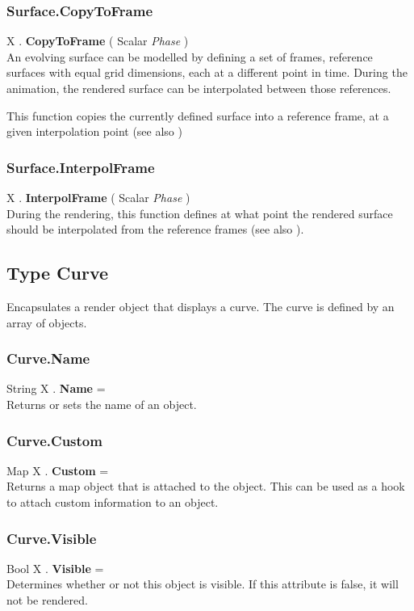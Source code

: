 \subsubsection{Surface.CopyToFrame \label{F:Surface:CopyToFrame}}
X . \textbf{CopyToFrame} ( Scalar \textit{Phase} ) \\
An evolving surface can be modelled by defining a set of frames, reference surfaces with equal grid dimensions, each at a different point in time. During the animation, the rendered surface can be interpolated between those references.

This function copies the currently defined surface into a reference frame, at a given interpolation point (see also )

\subsubsection{Surface.InterpolFrame \label{F:Surface:InterpolFrame}}
X . \textbf{InterpolFrame} ( Scalar \textit{Phase} ) \\
During the rendering, this function defines at what point the rendered surface should be interpolated from the reference frames (see also ).

\subsection{Type Curve \label{T:Curve}}
Encapsulates a render object that displays a curve. The curve is defined by an array of  objects.

\subsubsection{Curve.Name \label{F:Curve:Name}}
String X . \textbf{Name} = \\
Returns or sets the name of an object.

\subsubsection{Curve.Custom \label{F:Curve:Custom}}
Map X . \textbf{Custom} = \\
Returns a map object that is attached to the object. This can be used as a hook to attach custom information to an object.


\subsubsection{Curve.Visible \label{F:Curve:Visible}}
Bool X . \textbf{Visible} = \\
Determines whether or not this object is visible. If this attribute is false, it will not be rendered.

